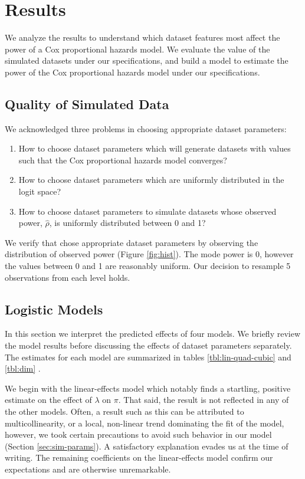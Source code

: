 \section{Results}

We analyze the results to understand which dataset features most affect the power of a Cox proportional hazards model. We evaluate the value of the simulated datasets under our specifications, and build a model to estimate the power of the Cox proportional hazards model under our specifications. 

\subsection{Quality of Simulated Data}

We acknowledged three problems in choosing appropriate dataset parameters:

\begin{enumerate}
    \item How to choose dataset parameters which will generate datasets with values such that the Cox proportional hazards model converges?
    \item How to choose dataset parameters which are uniformly distributed in the logit space? 
    \item How to choose dataset parameters to simulate datasets whose observed power, $\hat \rho$, is uniformly distributed between 0 and 1?
\end{enumerate}



We verify that chose appropriate dataset parameters by observing the distribution of observed power (Figure \ref{fig:hist}). The mode power is 0, however the values between 0 and 1 are reasonably uniform. Our decision to resample 5 observations from each level holds. 

\subsection{Logistic Models}

In this section we interpret the predicted effects of four models. We briefly review the model results before discussing the effects of dataset parameters separately. The estimates for each model are summarized in tables \ref{tbl:lin-quad-cubic} and \ref{tbl:dim}  \cite{stargazer}. 

We begin with the linear-effects model which notably finds a startling, positive estimate on the effect of $\lambda$ on $\pi$. That said, the result is not reflected in any of the other models. Often, a result such as this can be attributed to multicollinearity, or a local, non-linear trend dominating the fit of the model, however, we took certain precautions to avoid such behavior in our model (Section \ref{sec:sim-params}).  A satisfactory explanation evades us at the time of writing. The remaining coefficients on the linear-effects model confirm our expectations and are otherwise unremarkable.


